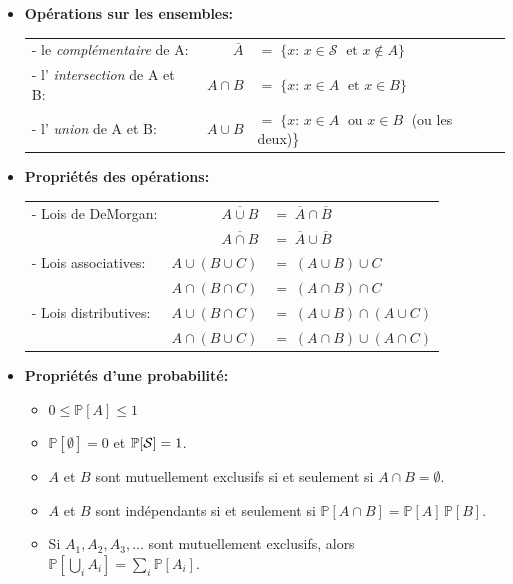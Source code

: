 \documentclass[12pt,french]{article}
\begin{document}
\begin{itemize}
\item {\bf Op\'erations sur les ensembles:}

\begin{tabular}{l r l}
 - le {\it compl\'ementaire} de A:& $\overline A$&$=\;\{x:\,x\in {\mathcal{S}} \;\mbox{ et } x \notin
 A\}$\\
 - l' {\it intersection} de A et B:& $A\cap B$&$=\;\{x:\,x\in A\;\mbox{ et } x\in
 B\}$\\
 - l' {\it union} de A et B:& $A\cup B$&$=\;\{x:\,x\in A\;\mbox{ ou } x\in B\;$ (ou les deux)\}
\end{tabular}

\item {\bf Propri\'et\'es des op\'erations:}

\begin{tabular}{l r l}
 - Lois de DeMorgan:  & $\overline {A \cup B}$&$=\;\overline A \cap \overline B$\\
                      & $\overline {A \cap B}$&$=\;\overline A \cup \overline B$\\
 - Lois associatives: & $A\cup (B\cup C)$&$=\;(A\cup B)\cup C$\\
                      & $A\cap (B\cap C)$&$=\;(A\cap B)\cap C$\\
 - Lois distributives:& $A\cup (B\cap C)$&$=\;(A\cup B)\cap (A\cup C)$\\
                      & $A\cap (B\cup C)$&$=\;(A\cap B)\cup (A\cap C)$\\
\end{tabular}

\item {\bf Propri\'et\'es d'une probabilit\'e:}
\begin{itemize}
\item $0 \le {\mathbb P}[A] \le 1$

\item ${\mathbb P}[\emptyset] = 0$ et ${\mathbb P}[{\cal S}] = 1$.

\item $A$ et $B$ sont mutuellement exclusifs si et seulement si $A\cap B = \emptyset$.

\item $A$ et $B$ sont ind\'ependants si et seulement si
${\mathbb P}[A \cap B] ={\mathbb P}[A] \, {\mathbb P}[B]$.

\item Si $A_1, A_2, A_3, ...$ sont mutuellement exclusifs, alors ${\mathbb
P}[\bigcup_{i} A_i] = \sum_{i}{\mathbb P}[A_i]$.


\end{itemize}
\end{itemize}
\end{document}
